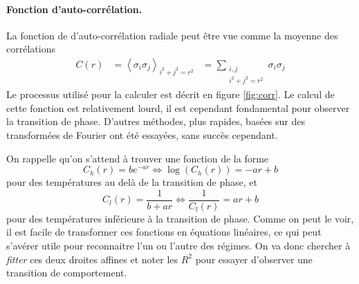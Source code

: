 \documentclass[a4paper, 11pt]{article}
\begin{document}
\paragraph{Fonction d'auto-corrélation.} La fonction de d'auto-corrélation radiale peut être vue
comme la moyenne des corrélations 
\begin{equation}
    \begin{aligned}
        C(r) &= \left< \sigma_i \sigma_j\right>_{i^2+j^2=r^2} 
        &= \sum_{\substack{i, j \\ i^2+j^2=r^2}} \sigma_i \sigma_j
    \end{aligned}
\end{equation}
Le processus utilisé pour la calculer est décrit en figure \ref{fig:corr}. Le calcul de cette
fonction est relativement lourd, il est cependant fondamental pour observer la transition de phase.
D'autres méthodes, plus rapides, basées sur des transformées de Fourier ont été essayées, sans
succès cependant.

On rappelle qu'on s'attend à trouver une fonction de la forme 
\begin{equation}
    C_h(r) = b e^{-ar} \iff \log(C_h(r)) = -a r + b
\end{equation}
pour des températures au delà de la transition de phase, et 
\begin{equation}
    C_l(r) = \frac{1}{b+ar} \iff \frac{1}{C_l(r)}  = a r + b  
\end{equation}
pour des températures inférieure à la transition de phase. Comme on peut le voir, il est facile de
transformer ces fonctions en équations linéaires, ce qui peut s'avérer utile pour reconnaitre l'un
ou l'autre des régimes. On va donc chercher à \emph{fitter} ces deux droites affines et noter les
$R^2$ pour essayer d'observer une transition de comportement.
\end{document}

